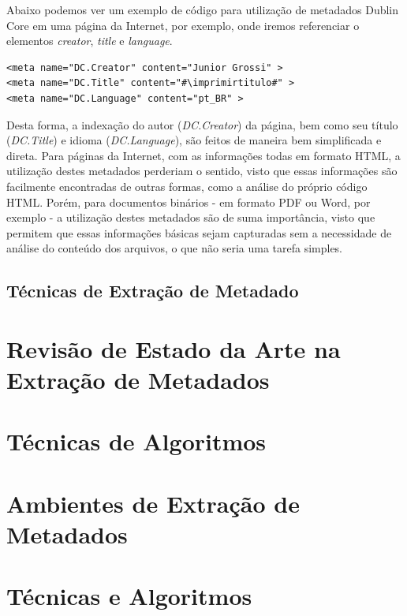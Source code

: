Abaixo podemos ver um exemplo de código para utilização de metadados Dublin Core em uma página da Internet, por exemplo, onde iremos referenciar o elementos \textit{creator}, \textit{title} e \textit{language}.

\lstset{language=HTML}
\begin{lstlisting}[escapechar=\#]
<meta name="DC.Creator" content="Junior Grossi" >
<meta name="DC.Title" content="#\imprimirtitulo#" >
<meta name="DC.Language" content="pt_BR" >
\end{lstlisting}

Desta forma, a indexação do autor (\textit{DC.Creator}) da página, bem como seu título (\textit{DC.Title}) e idioma (\textit{DC.Language}), são feitos de maneira bem simplificada e direta. Para páginas da Internet, com as informações todas em formato HTML, a utilização destes metadados perderiam o sentido, visto que essas informações são facilmente encontradas de outras formas, como a análise do próprio código HTML. Porém, para documentos binários - em formato PDF ou Word, por exemplo - a utilização destes metadados são de suma importância, visto que permitem que essas informações básicas sejam capturadas sem a necessidade de análise do conteúdo dos arquivos, o que não seria uma tarefa simples.


\subsection{Técnicas de Extração de Metadado}

\section{Revisão de Estado da Arte na Extração de Metadados}

\section{Técnicas de Algoritmos}

\section{Ambientes de Extração de Metadados}


\section{Técnicas e Algoritmos}

